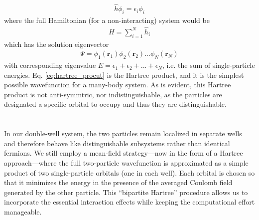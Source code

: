\documentclass{subfiles}
\begin{document}
\begin{align*}
    \hat{h}\phi_i = \epsilon_i\phi_i
\end{align*}
where the full Hamiltonian (for a non-interacting) system would be 
\begin{align*}
    H = \sum_{i=1}^N \hat{h}_i
\end{align*}
which has the solution eigenvector
\begin{align}
    \Psi = \phi_1(\mathbf{r}_1)\phi_2(\mathbf{r}_2)...\phi_N(\mathbf{r}_N)\label{eq:hartree_product}
\end{align}
with corresponding eigenvalue $E = \epsilon_1 + \epsilon_2 + ... + \epsilon_N$, i.e. the sum of single-particle energies. Eq. \ref{eq:hartree_procut} is the Hartree product, and it is the simplest possible wavefunction for a many-body system. As is evident, this Hartree product is not anti-symmtric, nor indistinguishable, as the particles are designated a specific orbital to occupy and thus they are distinguishable. \\ \\

\\
In our double-well system, the two particles remain localized in separate wells and therefore behave like distinguishable subsystems rather than identical fermions. We still employ a mean-field strategy—now in the form of a Hartree approach—where the full two-particle wavefunction is approximated as a simple product of two single-particle orbitals (one in each well). Each orbital is chosen so that it minimizes the energy in the presence of the averaged Coulomb field generated by the other particle. This “bipartite Hartree” procedure allows us to incorporate the essential interaction effects while keeping the computational effort manageable.
\end{document}
